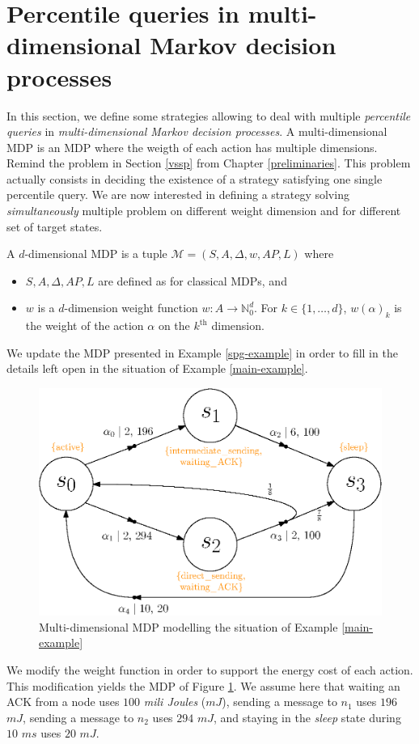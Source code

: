 \section{Percentile queries in multi-dimensional Markov decision processes}
In this section, we define some strategies allowing to deal with multiple \textit{percentile queries} in \textit{multi-dimensional Markov decision processes}.
A multi-dimensional MDP is an MDP where the weigth of each action has multiple dimensions.
Remind the \SSPP{} problem in Section \ref{vssp} from Chapter \ref{preliminaries}.
This problem actually consists in deciding the existence of a strategy satisfying one single percentile query.
We are now interested in defining a strategy solving \textit{simultaneously} multiple \SSPP{} problem on different weight dimension and for different set of target states.

\begin{definition}
  A $d$-dimensional MDP is a tuple $\mathcal{M}=(S, A, \Delta, w, AP, L)$ where
  \begin{itemize}
    \item $S, A, \Delta, AP, L$ are defined as for classical MDPs, and
    \item $w$ is a $d$-dimension weight function $w: A \rightarrow \mathbb{N}_0^d$.
    For $k \in \{1, \dots, d\}$, $w(\alpha)_k$ is the weight of the action $\alpha$ on the $k^\text{th}$ dimension.
  \end{itemize}
\end{definition}

\begin{example}
  We update the MDP presented in Example \ref{spg-example} in order to fill in the details left open in the situation of Example \ref{main-example}.
  \begin{figure}[h]
    \centering
    \includegraphics[width=0.6\linewidth]{resources/mdmdp2}
    \captionsetup{justification=centering}
    \caption{Multi-dimensional MDP modelling the situation of Example \ref{main-example}}
    \label{multi-mdp}
  \end{figure}
  We modify the weight function in order to support the energy cost of each action. This modification yields the MDP of Figure \ref{multi-mdp}.
  We assume here that waiting an ACK from a node uses $100$ \textit{mili Joules} ($mJ$), sending a message to $n_1$ uses $196$ $mJ$, sending a message to $n_2$ uses $294$ $mJ$, and staying in the \textit{sleep} state during $10$ $ms$ uses $20$ $mJ$.
\end{example}


